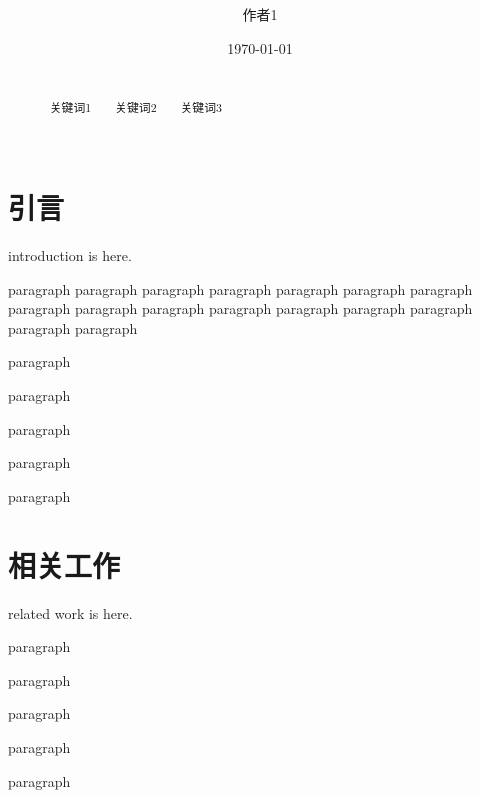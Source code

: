 \documentclass{ctexart}
\begin{document}
	\everymath{\displaystyle}%
	\abovedisplayshortskip=5pt%
	\belowdisplayshortskip=5pt
	\abovedisplayskip=5pt
	\belowdisplayskip=5pt
	\lineskiplimit=4pt
	\lineskip=4pt
	\title{ }%
	\date{\today}
	\author[1]{作者1\vspace{-1em}}%

	\maketitle 
	\begin{abstract}
		\\
		~~~{\kaishu 关键词1~~~~关键词2~~~~关键词3}\\
		\\
	\end{abstract}

	\vspace{-2em}
	\section{引言}

	introduction is here.

	paragraph paragraph paragraph paragraph paragraph paragraph paragraph paragraph paragraph paragraph paragraph paragraph paragraph paragraph paragraph paragraph

	paragraph

	paragraph

	paragraph

	paragraph

	paragraph

	\section{相关工作}

	related work is here.

	paragraph

	paragraph

	paragraph

	paragraph

	paragraph
\end{document}

